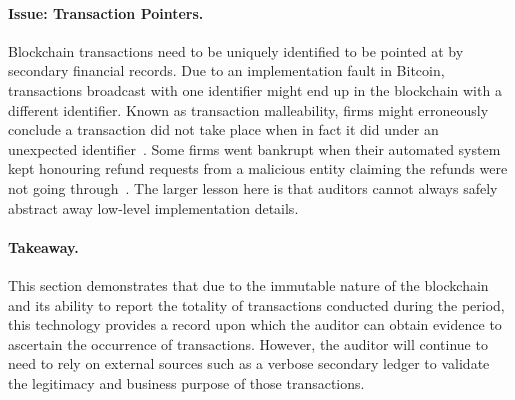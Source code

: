 \paragraph{Issue: Transaction Pointers.} Blockchain transactions need to be uniquely identified to be pointed at by secondary financial records. Due to an implementation fault in Bitcoin, transactions broadcast with one identifier might end up in the blockchain with a different identifier. Known as transaction malleability, firms might erroneously conclude a transaction did not take place when in fact it did under an unexpected identifier~\cite{andrychowicz2015malleability}. Some firms went bankrupt when their automated system kept honouring refund requests from a malicious entity claiming the refunds were not going through~\cite{trautman2014virtual,decker2014bitcoin}. The larger lesson here is that auditors cannot always safely abstract away low-level implementation details.   


\paragraph{Takeaway.} This section demonstrates that due to the immutable nature of the blockchain and its ability to report the totality of transactions conducted during the period, this technology provides a record upon which the auditor can obtain evidence to ascertain the occurrence of transactions. However, the auditor will continue to need to rely on external sources such as a verbose secondary ledger to validate the legitimacy and business purpose of those transactions. 


